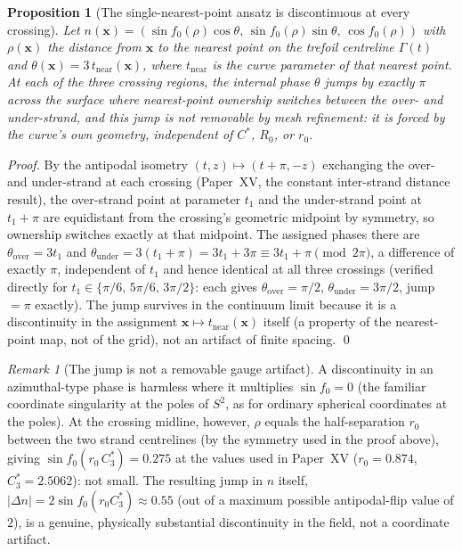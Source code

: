 \documentclass[11pt,a4paper]{article}
\newtheorem{proposition}[theorem]{Proposition}
\theoremstyle{definition}\newtheorem{definition}[theorem]{Definition}
\theoremstyle{remark}
\newtheorem{remark}[theorem]{Remark}
\theoremstyle{definition}\newtheorem{construction}[theorem]{Construction}
\begin{document}
\begin{proposition}[The single-nearest-point ansatz is discontinuous
  at every crossing]
\label{P16:prop:phase_jump}
Let $n(\mathbf{x}) = (\sin f_0(\rho)\cos\theta,\,\sin f_0(\rho)\sin\theta,\,\cos f_0(\rho))$
with $\rho(\mathbf{x})$ the distance from $\mathbf{x}$ to the nearest
point on the trefoil centreline $\Gamma(t)$ and
$\theta(\mathbf{x})=3\,t_{\mathrm{near}}(\mathbf{x})$, where
$t_{\mathrm{near}}$ is the curve parameter of that nearest point. At
each of the three crossing regions, the internal phase $\theta$ jumps
by exactly $\pi$ across the surface where nearest-point ownership
switches between the over- and under-strand, and this jump is not
removable by mesh refinement: it is forced by the curve's own
geometry, independent of $C^*$, $R_0$, or $r_0$.
\end{proposition}

\begin{proof}
By the antipodal isometry $(t,z)\mapsto(t+\pi,-z)$ exchanging the
over- and under-strand at each crossing (Paper~XV, the constant
inter-strand distance result), the over-strand point at parameter
$t_1$ and the under-strand point at $t_1+\pi$ are equidistant from
the crossing's geometric midpoint by symmetry, so ownership switches
exactly at that midpoint. The assigned phases there are
$\theta_{\mathrm{over}}=3t_1$ and
$\theta_{\mathrm{under}}=3(t_1+\pi)=3t_1+3\pi\equiv 3t_1+\pi
\pmod{2\pi}$, a difference of exactly $\pi$, independent of $t_1$ and
hence identical at all three crossings (verified directly for
$t_1\in\{\pi/6,\,5\pi/6,\,3\pi/2\}$: each gives
$\theta_{\mathrm{over}}=\pi/2$, $\theta_{\mathrm{under}}=3\pi/2$, jump
$=\pi$ exactly). The jump survives in the continuum limit because it
is a discontinuity in the assignment $\mathbf{x}\mapsto t_{\mathrm{near}}(\mathbf{x})$
itself (a property of the nearest-point map, not of the grid), not an
artifact of finite spacing.
\qed
\end{proof}

\begin{remark}[The jump is not a removable gauge artifact]
\label{P16:rem:not_a_pole}
A discontinuity in an azimuthal-type phase is harmless where it
multiplies $\sin f_0=0$ (the familiar coordinate singularity at the
poles of $S^2$, as for ordinary spherical coordinates at the poles).
At the crossing midline, however, $\rho$ equals the half-separation
$r_0$ between the two strand centrelines (by the symmetry used in the
proof above), giving $\sin f_0(r_0\,C_3^*)=0.275$ at the values used
in Paper~XV ($r_0=0.874$, $C_3^*=2.5062$): not small. The resulting
jump in $n$ itself,
$|\Delta n| = 2\sin f_0(r_0 C_3^*) \approx 0.55$
(out of a maximum possible antipodal-flip value of $2$), is a
genuine, physically substantial discontinuity in the field, not a
coordinate artifact.
\end{remark}
\end{document}
